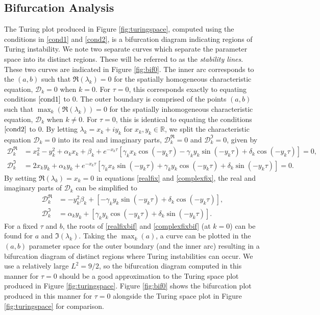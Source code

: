 \subsection{Bifurcation Analysis}\label{section:fixedbif}
The Turing plot produced in Figure \ref{fig:turingspace}, computed using the conditions in \eqref{cond1} and \eqref{cond2}, is a bifurcation diagram indicating regions of Turing instability. We note two separate curves which separate the parameter space into its distinct regions. These will be referred to as the \textit{stability lines}.
These two curves are indicated in Figure \ref{fig:bif0}. The inner arc corresponds to the $(a,b)$ such that $\Re(\lambda_k)=0$ for the
spatially homogeneous characteristic equation, $\mathcal{D}_k=0$ when $k=0$. For $\tau=0$, this corresponds exactly to equating conditions $\eqref{cond1}$ to 0. The outer boundary is comprised of the points $(a,b)$ such that $\max_k(\Re(\lambda_k))=0$ for the spatially inhomogeneous characteristic equation, $\mathcal{D}_k$ when $k\neq0$. For $\tau=0$, this is identical to equating the conditions $\eqref{cond2}$ to 0. By letting $\lambda_k=x_k+iy_k$ for $x_k,y_k\in\mathbb{R}$, we split the characteristic equation $\mathcal{D}_k=0$ into its real and imaginary parts, $\mathcal{D}_k^{\Re}=0$ and $\mathcal{D}_k^{\Im}=0$, given by
\begin{align}\label{realfix}
\mathcal{D}_k^{\Re}&=x_k^2-y_k^2+\alpha_kx_k+\beta_k+e^{-x_k\tau}[\gamma_kx_k\cos(-y_k\tau)-\gamma_ky_k\sin(-y_k\tau)+\delta_k\cos(-y_k\tau)]=0,\\
\mathcal{D}_k^{\Im}&=2x_ky_k+\alpha_ky_k+e^{-x_k\tau}[\gamma_kx_k\sin(-y_k\tau)+\gamma_ky_k\cos(-y_k\tau)+\delta_k\sin(-y_k\tau)]=0.\label{complexfix}
\end{align}
By setting $\Re(\lambda_k)=x_k=0$ in equations \eqref{realfix} and \eqref{complexfix}, the real and imaginary parts of $\mathcal{D}_k$ can be simplified to
\begin{align}\label{realfixbif}
  \mathcal{D}_k^{\Re}&=-y_k^2\beta_k+[-\gamma_ky_k\sin(-y_k\tau)+\delta_k\cos(-y_k\tau)],\\
  \mathcal{D}_k^{\Im}&=\alpha_ky_k+[\gamma_ky_k\cos(-y_k\tau)+\delta_k\sin(-y_k\tau)].\label{complexfixbif}
\end{align}
For a fixed $\tau$ and $b$, the roots of \eqref{realfixbif} and \eqref{complexfixbif} (at $k=0$) can be found for $a$ and $\Im(\lambda_k)$.
Taking the $\max_k(a)$, a curve can be plotted in the $(a,b)$ parameter space for the outer boundary (and the inner arc) resulting in a bifurcation diagram of distinct regions where Turing instabilities can occur. We use a relatively large $L^2=9/2$, so the bifurcation diagram computed in this manner for $\tau=0$ should be a good approximation to the Turing space plot produced in Figure \ref{fig:turingspace}. Figure \ref{fig:bif0} shows the bifurcation plot produced in this manner for $\tau=0$ alongside the Turing space plot in Figure \ref{fig:turingspace} for comparison.

